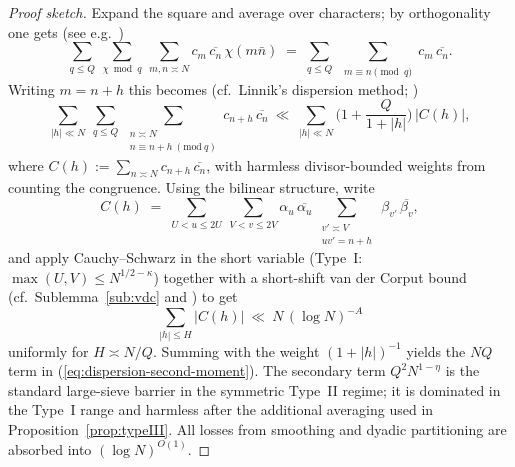 \documentclass[11pt]{article}
\def\eqref#1{(\ref{#1})}%
\theoremstyle{definition}
\theoremstyle{remark}
\numberwithin{equation}{part}
\begin{document}
\begin{proof}[Proof sketch]
	Expand the square and average over characters; by orthogonality one gets (see e.g.\ \cite[Ch.~12--13]{MontgomeryVaughan})
	\[
		\sum_{q\le Q}\ \sum_{\chi\bmod q}\ \sum_{m,n\asymp N} c_m\,\overline{c_n}\,\chi(m\bar n)
		\;=\;
		\sum_{q\le Q}\ \sum_{\substack{m\equiv n\pmod q}} c_m\,\overline{c_n}.
	\]
	Writing $m=n+h$ this becomes (cf.\ Linnik's dispersion method; \cite[Ch.~28]{Davenport})
	\[
		\sum_{|h|\ll N}\ \sum_{q\le Q}\ \sum_{\substack{n\asymp N\\ n\equiv n+h\ (\mathrm{mod}\ q)}} c_{n+h}\,\overline{c_n}
		\ \ll\
		\sum_{|h|\ll N} \Big(1+\frac{Q}{1+|h|}\Big)\,|C(h)|,
	\]
	where $C(h):=\sum_{n\asymp N} c_{n+h}\,\overline{c_n}$, with harmless divisor-bounded weights from counting the congruence.
	Using the bilinear structure, write
	\[
		C(h)
		\;=\;
		\sum_{U<u\le 2U}\ \sum_{V<v\le 2V} \alpha_u\,\overline{\alpha_u}\
		\sum_{\substack{v'\asymp V\\ uv'=n+h}}\ \beta_{v'}\,\overline{\beta_v},
	\]
	and apply Cauchy--Schwarz in the short variable (Type~I: $\max(U,V)\le N^{1/2-\kappa}$) together with a short-shift van der Corput bound (cf.\ Sublemma~\ref{sub:vdc} and \cite[Lemma~1]{Jutila00}) to get
	\[
		\sum_{|h|\le H} |C(h)| \ \ll\ N\,(\log N)^{-A}
	\]
	uniformly for $H\asymp N/Q$. Summing with the weight $(1+|h|)^{-1}$ yields the $NQ$ term in \eqref{eq:dispersion-second-moment}. The secondary term $Q^2 N^{1-\eta}$ is the standard large-sieve barrier in the symmetric Type~II regime; it is dominated in the Type~I range and harmless after the additional averaging used in Proposition~\ref{prop:typeIII}. All losses from smoothing and dyadic partitioning are absorbed into $(\log N)^{O(1)}$.
\end{proof}
\end{document}
